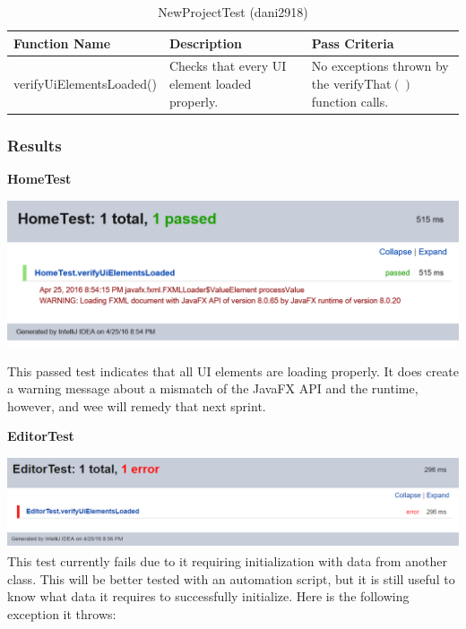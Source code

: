 \documentclass[twoside,letterpaper]{article}
\begin{document}
\begin{table}[h]
	\centering
	\caption{NewProjectTest (dani2918)}
	\begin{tabular}{|p{4cm}|p{5cm}|p{6cm}|}
		\hline
		\textbf{Function Name} & \textbf{Description} & \textbf{Pass Criteria}  \\\hline
		verifyUiElementsLoaded() & Checks that every UI element loaded properly. & No exceptions thrown by the verifyThat$\left(\right)$ function calls. \\\hline
	\end{tabular}
\end{table}

\newpage
\subsubsection{Results}

\textbf{HomeTest} \newline

\includegraphics[width=\textwidth]{images/TestPlan/HomeTest} 

This passed test indicates that all UI elements are loading properly. It does create a warning message about a mismatch of the JavaFX API and the runtime, however, and wee will remedy that next sprint.

\textbf{EditorTest} \newline

\noindent\includegraphics[width=\textwidth]{images/TestPlan/EditorTest} \\

This test currently fails due to it requiring initialization with data from another class. This will be better tested with an automation script, but it is still useful to know what data it requires to successfully initialize. Here is the following exception it throws:
\end{document}
